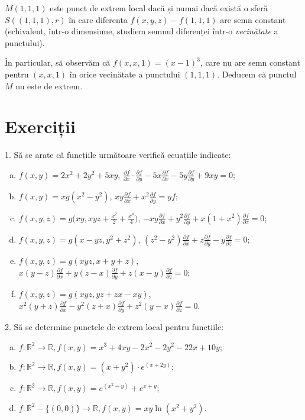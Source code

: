 \documentclass[11pt,a4paper]{article}
\newcommand\RR{\mathbb{R}}
\theoremstyle{dotless}
\theoremstyle{dotlessdr}
\begin{document}
$M(1, 1, 1)$ este punct de extrem local dacă și numai dacă există o sferă $S((1, 1, 1), r)$
în care diferența $f(x, y, z) - f(1, 1, 1)$ are semn constant (echivalent, într-o dimensiune,
studiem semnul diferenței într-o \emph{vecinătate} a punctului).

În particular, să observăm că $f(x, x, 1) = (x - 1)^3$, care nu are semn constant pentru
$(x, x, 1)$ în orice vecinătate a punctului $(1, 1, 1)$. Deducem că punctul $M$ nu este
de extrem.


\section{Exerciții}
\label{sec:exc}

1. Să se arate că funcțiile următoare verifică ecuațiile indicate:
\begin{enumerate}[(a)]
\item $f(x, y) = 2x^2 + 2y^2 + 5xy$,
  $\frac{\partial f}{\partial x} \cdot \frac{\partial f}{\partial y} - %
  5x \frac{\partial f}{\partial x} - 5y \frac{\partial f}{\partial y} + 9xy = 0$;
\item $f(x, y) = xg(x^2 - y^2)$,
  $xy \frac{\partial f}{\partial x} + x^2 \frac{\partial f}{\partial y} = yf$;
\item $f(x, y, z) = g\big(xy, xyz + \frac{x^2}{2} + \frac{x^4}{4} \big)$,
  $-xy \frac{\partial f}{\partial x} + y^2 \frac{\partial f}{\partial y} + %
  x(1 + x^2) \frac{\partial f}{\partial z} = 0$;
\item $f(x, y, z) = g(x - yz, y^2 + z^2)$, $(z^2 - y^2) \frac{\partial f}{\partial x} + %
  z \frac{\partial f}{\partial y} - y \frac{\partial f}{\partial z} = 0$;
\item $f(x, y, z) = g(xyz, x + y + z)$,
  $x(y - z) \frac{\partial f}{\partial x} + y(z - x) \frac{\partial f}{\partial y} +
  z(x - y) \frac{\partial f}{\partial z} = 0$;
\item $f(x, y, z) = g(xyz, yz + zx - xy)$,
  $x^2(y + z) \frac{\partial f}{\partial x} - y^2(z + x) \frac{\partial f}{\partial y} + %
  z^2(y - x) \frac{\partial f}{\partial z} = 0$.
\end{enumerate}

\vspace{1cm}

2. Să se determine punctele de extrem local pentru funcțiile:
\begin{enumerate}[(a)]
\item $f : \RR^2 \to \RR, f(x, y) = x^3 + 4xy - 2x^2 - 2y^2 - 22x + 10 y$;
\item $f : \RR^2 \to \RR, f(x, y) = (x + y^2) \cdot e^{(x + 2y)}$;
\item $f : \RR^2 \to \RR, f(x, y) = e^{(x^2 - y)} + e^{x + y}$;
\item $f : \RR^2 - \{(0, 0)\} \to \RR, f(x, y) = xy \ln (x^2 + y^2)$.
\end{enumerate}
\end{document}
